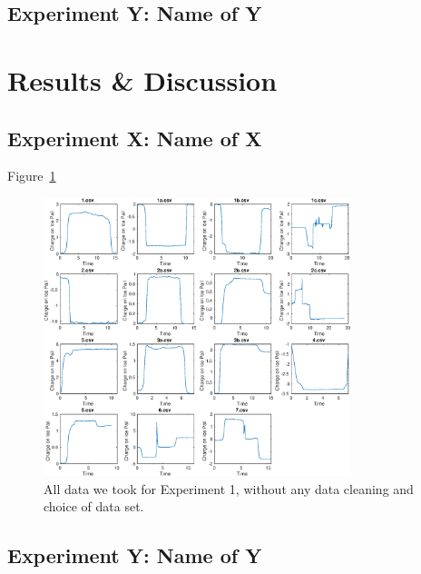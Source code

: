 \documentclass[11pt]{article}
\begin{document}
\subsection{Experiment Y: Name of Y    }


\section{Results \& Discussion}
\subsection{Experiment X: Name of X}

Figure~\ref{fig:exp1data}

\begin{figure}[H]
\centering
\includegraphics[width=0.8\textwidth]{./images/figure1.eps}
\caption{All data we took for Experiment 1, without any data cleaning and choice of data set.}
\label{fig:exp1data}
\end{figure}



\subsection{Experiment Y: Name of Y} 
\end{document}
